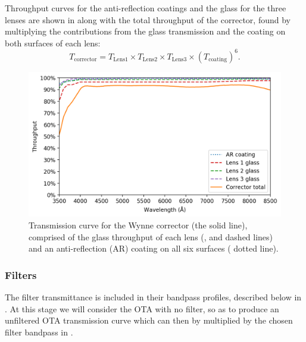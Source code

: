 \begin{colsection}
Throughput curves for the anti-reflection coatings and the glass for the three lenses are shown in  along with the total throughput of the corrector, found by multiplying the contributions from the glass transmission and the coating on both surfaces of each lens:
%
\begin{equation}
    T_\text{corrector} = T_\text{Lens1} \times
                         T_\text{Lens2} \times
                         T_\text{Lens3} \times
                         {(T_\text{coating})}^6.
    \label{eq:corrector}
\end{equation}

\newpage

\begin{figure}[t]
    \begin{center}
        \includegraphics[width=\linewidth]{images/throughput/trans_lenses.png}
    \end{center}
    \caption[Wynne corrector transmission curve]{
        Transmission curve for the Wynne corrector (the  solid line), comprised of the glass throughput of each lens (,  and  dashed lines) and an anti-reflection (AR) coating on all six surfaces ( dotted line).
    }\label{fig:trans_lenses}
\end{figure}

\subsubsection{Filters}

The filter transmittance is included in their bandpass profiles, described below in . At this stage we will consider the OTA with no filter, so as to produce an unfiltered OTA transmission curve which can then by multiplied by the chosen filter bandpass in .


\end{colsection}
